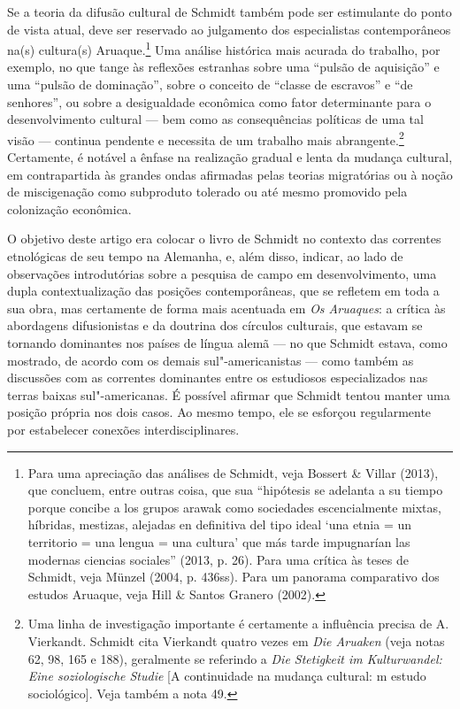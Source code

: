 Se a teoria da difusão cultural de Schmidt também pode ser estimulante
do ponto de vista atual, deve ser reservado ao julgamento dos
especialistas contemporâneos na(s) cultura(s) Aruaque.\footnote{Para uma
  apreciação das análises de Schmidt, veja Bossert \& Villar (2013), que
  concluem, entre outras coisa, que sua ``hipótesis se adelanta a su
  tiempo porque concibe a los grupos arawak como sociedades
  escencialmente mixtas, híbridas, mestizas, alejadas en definitiva del
  tipo ideal `una etnia = un territorio = una lengua = una cultura' que
  más tarde impugnarían las modernas ciencias sociales'' (2013, p. 26).
  Para uma crítica às teses de Schmidt, veja Münzel (2004, p. 436ss).
  Para um panorama comparativo dos estudos Aruaque, veja Hill \& Santos
  Granero (2002).} Uma análise histórica mais acurada do trabalho, por
exemplo, no que tange às reflexões estranhas sobre uma ``pulsão de
aquisição'' e uma ``pulsão de dominação'', sobre o conceito de ``classe
de escravos'' e ``de senhores'', ou sobre a desigualdade econômica como
fator determinante para o desenvolvimento cultural --- bem como as
consequências políticas de uma tal visão --- continua pendente e
necessita de um trabalho mais abrangente.\footnote{Uma linha de
  investigação importante é certamente a influência precisa de A.
  Vierkandt. Schmidt cita Vierkandt quatro vezes em \emph{Die Aruaken}
  (veja notas 62, 98, 165 e 188), geralmente se referindo a \emph{Die
  Stetigkeit im Kulturwandel: Eine soziologische Studie} {[}A
  continuidade na mudança cultural: m estudo sociológico{]}. Veja
  também a nota 49.} Certamente, é notável a ênfase na realização
gradual e lenta da mudança cultural, em contrapartida às grandes ondas
afirmadas pelas teorias migratórias ou à noção de miscigenação como
subproduto tolerado ou até mesmo promovido pela colonização econômica.

O objetivo deste artigo era colocar o livro de Schmidt no contexto das
correntes etnológicas de seu tempo na Alemanha, e, além disso, indicar,
ao lado de observações introdutórias sobre a pesquisa de campo em
desenvolvimento, uma dupla contextualização das posições contemporâneas,
que se refletem em toda a sua obra, mas certamente de forma mais
acentuada em \emph{Os Aruaques}: a crítica às abordagens difusionistas e
da doutrina dos círculos culturais, que estavam se tornando dominantes
nos países de língua alemã --- no que Schmidt estava, como mostrado, de
acordo com os demais sul"-americanistas --- como também as discussões com
as correntes dominantes entre os estudiosos especializados nas terras
baixas sul"-americanas. É possível afirmar que Schmidt tentou manter uma
posição própria nos dois casos. Ao mesmo tempo, ele se esforçou
regularmente por estabelecer conexões interdisciplinares.

